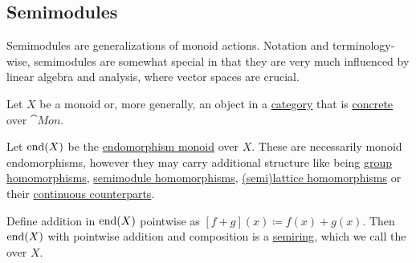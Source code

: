 \subsection{Semimodules}\label{subsec:semimodules}

Semimodules are generalizations of monoid actions. Notation and terminology-wise, semimodules are somewhat special in that they are very much influenced by linear algebra and analysis, where vector spaces are crucial.

\begin{definition}\label{def:endomorphism_semiring}
  Let \( X \) be a monoid or, more generally, an object in a \hyperref[def:category]{category} that is \hyperref[def:concrete_category]{concrete} over \hyperref[def:monoid/category]{\( \cat{Mon} \)}.

  Let \( \operatorname{end}(X) \) be the \hyperref[def:endomorphism_monoid]{endomorphism monoid} over \( X \). These are necessarily monoid endomorphisms, however they may carry additional structure like being \hyperref[def:group/homomorphism]{group homomorphisms}, \hyperref[def:semimodule/homomorphism]{semimodule homomorphisms}, \hyperref[def:semilattice/homomorphism]{(semi)lattice homomorphisms} or their \hyperref[rem:topological_first_order_structures]{continuous counterparts}.

  Define addition in \( \operatorname{end}(X) \) pointwise as \( [f + g](x) \coloneqq f(x) + g(x) \). Then \( \operatorname{end}(X) \) with pointwise addition and composition is a \hyperref[def:semiring]{semiring}, which we call the  over \( X \).
\end{definition}

